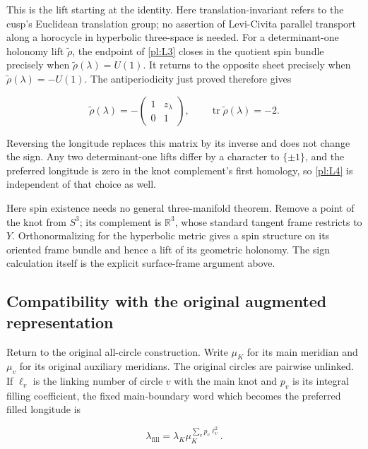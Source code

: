 This is the lift starting at the identity.
Here translation-invariant refers to the cusp's Euclidean translation
group; no assertion of Levi-Civita parallel transport along a
horocycle in hyperbolic three-space is needed.
For a determinant-one holonomy lift \(\widetilde\rho\),
the endpoint of \eqref{pl:L3} closes in the quotient spin bundle precisely
when
\(\widetilde\rho(\lambda)=U(1)\).
It returns to the opposite sheet precisely when
\(\widetilde\rho(\lambda)=-U(1)\).
The antiperiodicity just proved therefore gives

\begin{equation}\label{pl:L4}
\boxed{\displaystyle
 \widetilde\rho(\lambda)=
       -\begin{pmatrix}1&z_\lambda\\0&1\end{pmatrix},
 \qquad
 \operatorname{tr}\widetilde\rho(\lambda)=-2.}
\end{equation}

Reversing the longitude replaces this matrix by its inverse and
does not change the sign. Any two determinant-one lifts differ
by a character to \(\{\pm1\}\), and the preferred longitude
is zero in the knot complement's first homology, so \eqref{pl:L4} is
independent of that choice as well.

Here spin existence needs no general three-manifold theorem.
Remove a point of the knot from \(S^3\); its complement is
\(\mathbb R^3\), whose standard tangent frame restricts to \(Y\).
Orthonormalizing for the hyperbolic metric gives a spin structure
on its oriented frame bundle and hence a lift of its geometric
holonomy. The sign calculation itself is the explicit surface-frame
argument above.

\subsection{Compatibility with the original augmented representation}\label{pl:compatibility-with-the-original-augmented-representation}

Return to the original all-circle construction. Write
\(\mu_K\) for its main meridian and \(\mu_v\) for its
original auxiliary meridians. The original circles are pairwise
unlinked. If \(\ell_v\) is the linking number of circle
\(v\) with the main knot and \(p_v\) is its integral
filling coefficient, the fixed main-boundary word which becomes
the preferred filled longitude is

\begin{equation}\label{pl:L5}
\lambda_{\mathrm{fill}}
       =\lambda_K\mu_K^{\sum_vp_v\ell_v^2}.
\end{equation}

